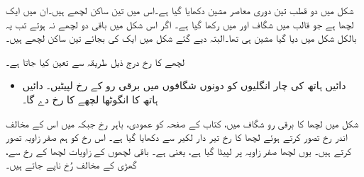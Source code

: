 شکل   میں دو قطب  تین دوری معاصر مشین دکھایا گیا ہے۔اس میں تین ساکن لچھے ہیں۔ان میں ایک لچھا  ہے جو قالب میں  شگاف   اور  میں رکھا گیا ہے۔ اگر اس شکل میں باقی دو لچھے نہ ہوتے تب یہ بالکل شکل   میں دیا گیا مشین ہی تھا۔البتہ دیے گئے شکل میں ایک کی بجائے تین ساکن لچھے ہیں۔

لچھے کا رخ درج ذیل طریقہ سے تعین کیا جاتا ہے۔

\begin{itemize}
\item
دائیں ہاتھ کی چار انگلیوں کو دونوں شگافوں میں برقی رو کے رخ لپیٹیں۔ دائیں ہاتھ کا انگوٹھا لچھے کا رخ دے گا۔
\end{itemize}

 شکل  میں  لچھا    کا برقی رو  شگاف  میں،  کتاب کے صفحہ کو عمودی،  باہر رخ جبکہ    میں اس کے مخالف اندر رخ تصور کرتے ہوئے  لچھا  کا رخ تیر دار لکیر سے دکھایا گیا ہے۔ اس رخ کو ہم صفر زاویہ تصور کرتے ہیں۔ یوں لچھا   صفر زاویہ پر لپیٹا گیا ہے، یعنی  ہے۔ باقی لچھوں کے زاویات   لچھا  کے رخ سے، گھڑی کے مخالف رُخ ناپے جاتے ہیں۔

